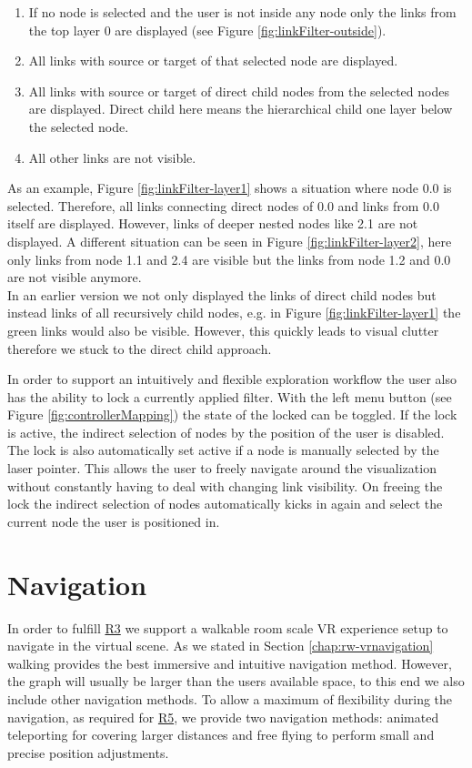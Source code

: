 \begin{enumerate}
    \item If no node is selected and the user is not inside any node only the links from the top layer 0 are displayed (see Figure \ref{fig:linkFilter-outside}).
    \item All links with source or target of that selected node are displayed. 
    \item All links with source or target of direct child nodes from the selected nodes are displayed. Direct child here means the hierarchical child one layer below the selected node. 
    \item All other links are not visible.
\end{enumerate}

As an example, Figure \ref{fig:linkFilter-layer1} shows a situation where node 0.0 is selected. Therefore, all links connecting direct nodes of 0.0 and links from 0.0 itself are displayed. However, links of deeper nested nodes like 2.1 are not displayed. 
A different situation can be seen in Figure \ref{fig:linkFilter-layer2}, here only links from node 1.1 and 2.4 are visible but the links from node 1.2 and 0.0 are not visible anymore.\\
In an earlier version we not only displayed the links of direct child nodes but instead links of all recursively child nodes, e.g. in Figure \ref{fig:linkFilter-layer1} the green links would also be visible. However, this quickly leads to visual clutter therefore we stuck to the direct child approach.

In order to support an intuitively and flexible exploration workflow the user also has the ability to lock a currently applied filter.
With the left menu button (see Figure \ref{fig:controllerMapping}) the state of the locked can be toggled. 
If the lock is active, the indirect selection of nodes by the position of the user is disabled. The lock is also automatically set active if a node is manually selected by the laser pointer. 
This allows the user to freely navigate around the visualization without constantly having to deal with changing link visibility. 
On freeing the lock the indirect selection of nodes automatically kicks in again and select the current node the user is positioned in.

\section{Navigation}
\label{chap:solution-navigation}
In order to fulfill \hyperref[req:R3]{R3} we support a walkable room scale VR experience setup to navigate in the virtual scene. As we stated in Section \ref{chap:rw-vrnavigation} walking provides the best immersive and intuitive navigation method.
However, the graph will usually be larger than the users available space, to this end we also include other navigation methods.
To allow a maximum of flexibility during the navigation, as required for \hyperref[req:R5]{R5}, we provide two navigation methods: animated teleporting for covering larger distances and free flying to perform small and precise position adjustments.

